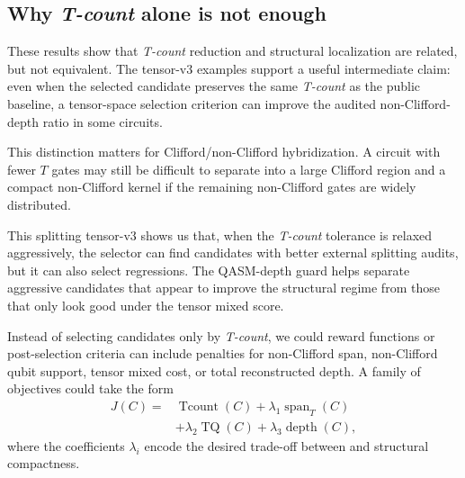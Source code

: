 \documentclass[conference]{IEEEtran}
\newcommand{\tcount}{\textit{T-count}}
\begin{document}
\subsection{Why \tcount{} alone is not enough}

These results show that \tcount{} reduction and structural localization are related, but not equivalent. The tensor-v3 examples support a useful intermediate claim: even when the selected candidate preserves the same \tcount{} as the public baseline, a tensor-space selection criterion can improve the audited non-Clifford-depth ratio in some circuits.

This distinction matters for Clifford/non-Clifford hybridization. A circuit with fewer $T$ gates may still be difficult to separate into a large Clifford region and a compact non-Clifford kernel if the remaining non-Clifford gates are widely distributed.


This splitting tensor-v3 shows us that, when the \tcount{} tolerance is relaxed aggressively, the selector can find candidates with better external splitting audits, but it can also select regressions. The QASM-depth guard helps separate aggressive candidates that appear to improve the structural regime from those that only look good under the tensor mixed score.



Instead of selecting candidates only by \tcount{}, we could reward functions or post-selection criteria can include penalties for non-Clifford span, non-Clifford qubit support, tensor mixed cost, or total reconstructed depth. A family of objectives could take the form
\begin{equation}
\begin{aligned}
J(C)
= {} & \operatorname{Tcount}(C)
+ \lambda_1 \operatorname{span}_T(C) \\
& + \lambda_2 \operatorname{TQ}(C)
+ \lambda_3 \operatorname{depth}(C),
\end{aligned}
\end{equation}
where the coefficients $\lambda_i$ encode the desired trade-off between  and structural compactness.



\clearpage



\end{document}
